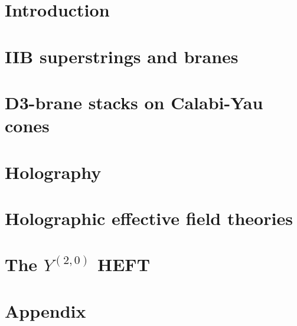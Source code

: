 \documentclass[12pt,a4paper,oneside,openright,titlepage]{book}
\author{Riccardo Antonelli}
\begin{document}
\frontmatter




\tableofcontents

\mainmatter

\chapter{Introduction}



\chapter{IIB superstrings and branes}



\chapter{D3-brane stacks on Calabi-Yau cones}



\chapter{Holography}



\chapter{Holographic effective field theories}



\chapter{The $Y^{(2,0)}$ HEFT}

%



\appendix

\chapter{Appendix}




\backmatter



\end{document}
